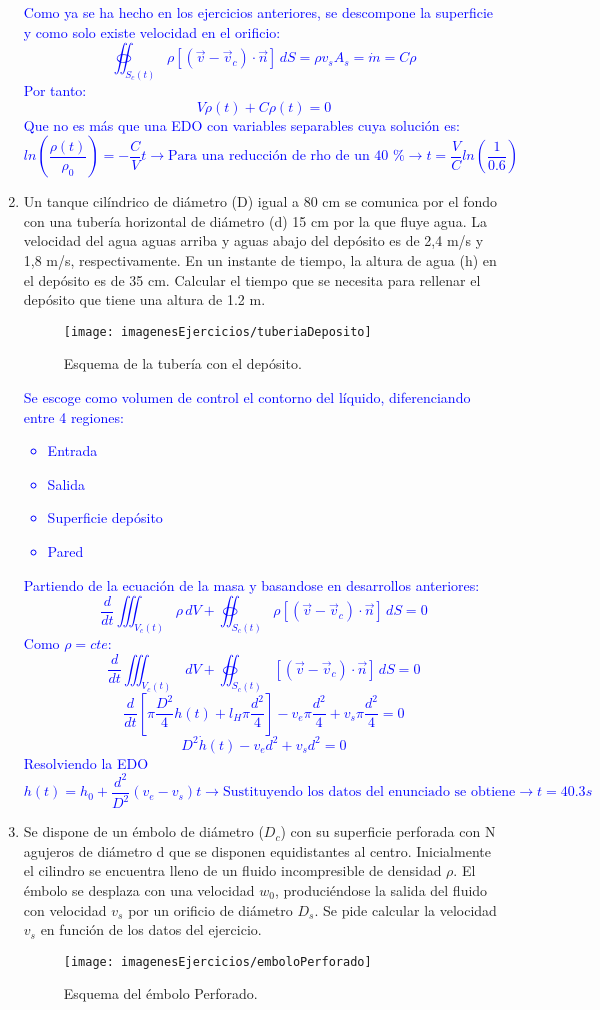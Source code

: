 \begin{enumerate}
	\textcolor{blue}{Como ya se ha hecho en los ejercicios anteriores, se descompone la superficie y como solo existe velocidad en el orificio:
	\[\oiint_{S_c(t)} \rho\left[(\vec{v}-\vec{v}_c)\cdot\vec{n}\right] \,dS=\rho v_s A_s = \dot{m}=C\rho\]	
	Por tanto:
	\[V \dot{\rho}(t)+C\rho(t)=0\]
	Que no es más que una EDO con variables separables cuya solución es:
	\[ln\left(\frac{\rho(t)}{\rho _0}\right)=-\frac{C}{V}t \rightarrow \text{Para una reducción de rho de un 40 \%} \rightarrow t=\frac{V}{C}ln\left(\frac{1}{0.6}\right)\]}
	\newpage
	\item Un tanque cilíndrico de diámetro (D) igual a 80 cm se comunica por el fondo con una
	tubería horizontal de diámetro (d) 15 cm por la que fluye agua. La
	velocidad del agua aguas arriba y aguas abajo del depósito es de 2,4 m/s y 1,8 m/s,
	respectivamente. En un instante de tiempo, la altura de agua (h) en el depósito es de 35
	cm. Calcular el tiempo que se necesita para rellenar el depósito que tiene una altura de
	1.2 m.
	\begin{figure}[H] 
		\centering
		\texttt{[image: imagenesEjercicios/tuberiaDeposito]}
		\caption{Esquema de la tubería con el depósito.}
		\label{fig:tuberiadeposito}
	\end{figure}
	\textcolor{blue}{
	Se escoge como volumen de control el contorno del líquido, diferenciando entre 4 regiones:
	\begin{itemize}
		\item Entrada
		\item Salida
		\item Superficie depósito
		\item Pared
	\end{itemize}
	Partiendo de la ecuación de la masa y basandose en desarrollos anteriores:
	\[\frac{d}{dt}\iiint_{V_c(t)}\rho\,dV+\oiint_{S_c(t)} \rho\left[(\vec{v}-\vec{v}_c)\cdot\vec{n}\right] \,dS=0\]
	Como $\rho= cte$:
	\[\frac{d}{dt}\iiint_{V_c(t)}\,dV+\oiint_{S_c(t)} \left[(\vec{v}-\vec{v}_c)\cdot\vec{n}\right] \,dS=0\]
	\[\frac{d}{dt}\left[\pi \frac{D^2}{4}h(t)+l_{H}\pi\frac{d^2}{4}\right]-v_e\pi\frac{d^2}{4}+v_s\pi\frac{d^2}{4}=0\]
	\[D^2\dot{h}(t)-v_e d^2+v_s d^2=0\]
	Resolviendo la EDO
	\[h(t)=h_0+\frac{d^2}{D^2}\left(v_e-v_s\right) t\rightarrow \text{Sustituyendo los datos del enunciado se obtiene} \rightarrow t=40.3s\]
	}
	\item Se dispone de un émbolo de diámetro ($D_c$) con su superficie perforada con N agujeros de
	diámetro d que se disponen equidistantes al centro. Inicialmente el cilindro
	se encuentra lleno de un fluido incompresible de densidad $\rho$. El émbolo se desplaza con
	una velocidad $w_0$, produciéndose la salida del fluido con velocidad $v_s$ por un orificio de
	diámetro $D_s$. Se pide calcular la velocidad $v_s$ en función de los datos del ejercicio.
	\begin{figure}[H] 
		\centering
		\texttt{[image: imagenesEjercicios/emboloPerforado]}
		\caption{Esquema del émbolo Perforado.}
		\label{fig:emboloperforado}


\end{figure}
\end{enumerate}
